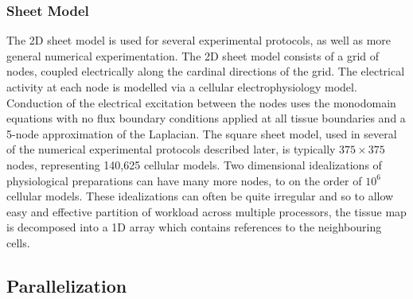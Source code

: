 \subsubsection{Sheet Model}


The 2D sheet model is used for several experimental protocols, as well as more
general numerical experimentation.  The 2D sheet model consists of a grid of
nodes, coupled electrically along the cardinal directions of the grid.  The
electrical activity at each node is modelled via a cellular electrophysiology
model.  Conduction of the electrical excitation between the nodes uses the
monodomain equations with no flux boundary conditions applied at all tissue
boundaries and a 5-node approximation of the Laplacian.  The square sheet model,
used in several of the numerical experimental protocols described later, is
typically $375\times375$ nodes, representing 140,625 cellular models.  Two dimensional
idealizations of physiological preparations can have many more nodes, to on the
order of $10^{6}$ cellular models.  These idealizations can often be quite
irregular and so to allow easy and effective partition of workload across
multiple processors, the tissue map is decomposed into a 1D array which contains
references to the neighbouring cells.


\subsection{Parallelization}

